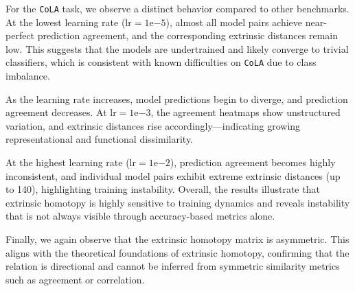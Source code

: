 For the \texttt{CoLA} task, we observe a distinct behavior compared to other benchmarks.  
At the lowest learning rate (\( \text{lr} = 1\mathrm{e}{-5} \)), almost all model pairs achieve near-perfect prediction agreement, and the corresponding extrinsic distances remain low.  
This suggests that the models are undertrained and likely converge to trivial classifiers, which is consistent with known difficulties on \texttt{CoLA} due to class imbalance.

As the learning rate increases, model predictions begin to diverge, and prediction agreement decreases.  
At \( \text{lr} = 1\mathrm{e}{-3} \), the agreement heatmaps show unstructured variation, and extrinsic distances rise accordingly—indicating growing representational and functional dissimilarity.

At the highest learning rate (\( \text{lr} = 1\mathrm{e}{-2} \)), prediction agreement becomes highly inconsistent, and individual model pairs exhibit extreme extrinsic distances (up to 140), highlighting training instability.  
Overall, the results illustrate that extrinsic homotopy is highly sensitive to training dynamics and reveals instability that is not always visible through accuracy-based metrics alone.

Finally, we again observe that the extrinsic homotopy matrix is asymmetric.
This aligns with the theoretical foundations of extrinsic homotopy, confirming that the relation is directional and cannot be inferred from symmetric similarity metrics such as agreement or correlation.

